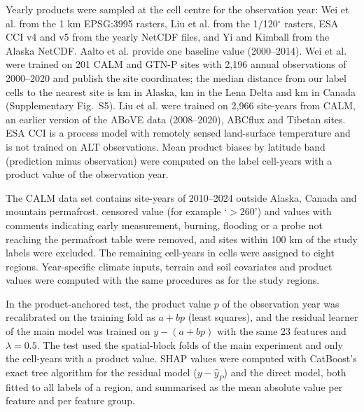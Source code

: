\documentclass[pdflatex,sn-nature]{sn-jnl}
\begin{document}
Yearly products were sampled at the cell centre for the observation year: Wei et al.\cite{Wei2026} from the 1 km EPSG:3995 rasters, Liu et al.\cite{Liu2024} from the 1/120$^\circ$ rasters, ESA CCI v4 and v5\cite{Westermann2024,Westermann2025} from the yearly NetCDF files, and Yi and Kimball\cite{YiKimball2019} from the Alaska NetCDF. Aalto et al.\cite{Aalto2018} provide one baseline value (2000--2014). Wei et al. were trained on 201 CALM and GTN-P sites with 2,196 annual observations of 2000--2020 and publish the site coordinates; the median distance from our label cells to the nearest site is \ndistweiAkmed{} km in Alaska, \ndistweiLemed{} km in the Lena Delta and \ndistweiCamed{} km in Canada (Supplementary Fig.~S5). Liu et al. were trained on 2,966 site-years from CALM, an earlier version of the ABoVE data (2008--2020), ABCflux and Tibetan sites. ESA CCI is a process model with remotely sensed land-surface temperature and is not trained on ALT observations. Mean product biases by latitude band (prediction minus observation) were computed on the label cell-years with a product value of the observation year.

The CALM data set\cite{Streletskiy2025} contains \nextRawSy{} site-years of 2010--2024 outside Alaska, Canada and mountain permafrost. \nextCens{} censored value (for example `$>$260') and \nextQcRm{} values with comments indicating early measurement, burning, flooding or a probe not reaching the permafrost table were removed, and sites within 100 km of the study labels were excluded. The remaining \nextcy{} cell-years in \nextcells{} cells were assigned to eight regions. Year-specific climate inputs, terrain and soil covariates and product values were computed with the same procedures as for the study regions.

In the product-anchored test, the product value $p$ of the observation year was recalibrated on the training fold as $a+bp$ (least squares), and the residual learner of the main model was trained on $y-(a+bp)$ with the same 23 features and $\lambda=0.5$. The test used the spatial-block folds of the main experiment and only the cell-years with a product value. SHAP values\cite{Lundberg2017} were computed with CatBoost's exact tree algorithm for the residual model ($y-\hat{y}_P$) and the direct model, both fitted to all labels of a region, and summarised as the mean absolute value per feature and per feature group.
\end{document}
